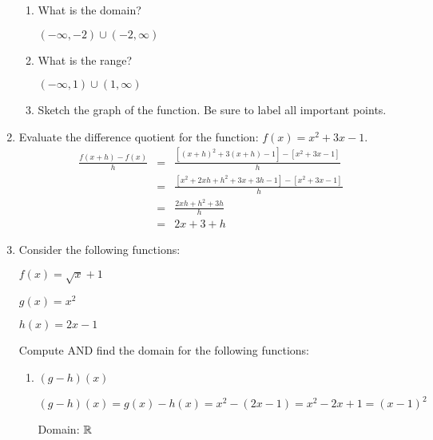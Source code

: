 \documentclass[letterpaper,12pt,fleqn]{article}
\begin{document}
\begin{enumerate}
\begin{enumerate}
  \item What is the domain?

    $(-\infty,-2)\cup(-2,\infty)$
    
  \item What is the range?

    $(-\infty,1)\cup(1,\infty)$

  \item Sketch the graph of the function. Be sure to label all important
    points.

  \end{enumerate}

\item Evaluate the difference quotient for the function: $f(x)=x^2+3x-1$.
  \begin{eqnarray*}
    \frac{f(x+h)-f(x)}{h} &=& \frac{[(x+h)^2+3(x+h)-1]-[x^2+3x-1]}{h} \\
    &=& \frac{[x^2+2xh+h^2+3x+3h-1]-[x^2+3x-1]}{h} \\
    &=& \frac{2xh+h^2+3h}{h} \\
    &=& 2x+3+h
  \end{eqnarray*}
  
\item Consider the following functions:

  $f(x)=\sqrt{x}+1$

  $g(x)=x^2$

  $h(x)=2x-1$

  Compute AND find the domain for the following functions:

  \begin{enumerate}
  \item $(g-h)(x)$

    $(g-h)(x)=g(x)-h(x)=x^2-(2x-1)=x^2-2x+1=(x-1)^2$

    Domain: $\mathbb{R}$


\end{enumerate}
\end{enumerate}
\end{document}
